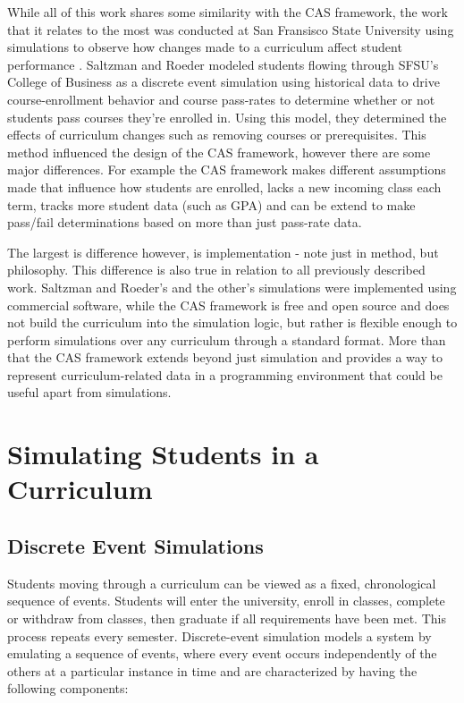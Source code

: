 \documentclass[botnum, fleqn]{unmeethesis}
\begin{document}
    While all of this work shares some similarity with the CAS framework, the work that it relates to the most was conducted at San Fransisco State University using simulations to observe how changes made to a curriculum affect student performance \cite{saltzman2012simulating}. Saltzman and Roeder modeled students flowing through SFSU's College of Business as a discrete event simulation using historical data to drive course-enrollment behavior and course pass-rates to determine whether or not students pass courses they're enrolled in. Using this model, they determined the effects of curriculum changes such as removing courses or prerequisites. This method influenced the design of the CAS framework, however there are some major differences. For example the CAS framework makes different assumptions made that influence how students are enrolled, lacks a new incoming class each term, tracks more student data (such as GPA) and can be extend to make pass/fail determinations based on more than just pass-rate data.

    The largest is difference however, is implementation - note just in method, but philosophy. This difference is also true in relation to all previously described work. Saltzman and Roeder's and the other's simulations were implemented using commercial software, while the CAS framework is free and open source and does not build the curriculum into the simulation logic, but rather is flexible enough to perform simulations over any curriculum through a standard format. More than that the CAS framework extends beyond just simulation and provides a way to represent curriculum-related data in a programming environment that could be useful apart from simulations.

\chapter{Simulating Students in a Curriculum}

  \section{Discrete Event Simulations}
  Students moving through a curriculum can be viewed as a fixed, chronological sequence of events. Students will enter the university, enroll in classes, complete or withdraw from classes, then graduate if all requirements have been met. This process repeats every semester. Discrete-event simulation models a system by emulating a sequence of events, where every event occurs independently of the others at a particular instance in time and are characterized by having the following components:
\end{document}
